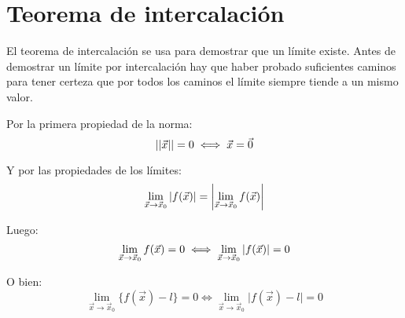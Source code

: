 




\section{Teorema de intercalación}

El teorema de intercalación se usa para demostrar que un límite existe.
Antes de demostrar un límite por intercalación hay que haber probado suficientes caminos para tener certeza que por todos los caminos el límite siempre tiende a un mismo valor.

Por la primera propiedad de la norma:
\begin{equation*}
    {\left|\left| {\Vec{x}} \right|\right|} = 0 \iff \Vec{x} = \Vec{0}
\end{equation*}

Y por las propiedades de los límites:
\begin{equation*}
    \displaystyle\lim_{\Vec{x} \to \Vec{x}_0} {\left| {f(\Vec{x})} \right|}
    = {\left| {\displaystyle\lim_{\Vec{x} \to \Vec{x}_0} f(\Vec{x})} \right|}
\end{equation*}

Luego:
\begin{equation*}
    \lim_{\Vec{x} \to \Vec{x}_0} f(\Vec{x}) = 0 \iff \lim_{\Vec{x} \to \Vec{x}_0} {\left| {f(\Vec{x})} \right|} = 0
\end{equation*}

O bien:
\begin{equation*}
    \lim_{\Vec{x} \to \Vec{x}_0} \Big\{ f(\Vec{x}) - l \Big\} = 0
    \iff
    \lim_{\Vec{x} \to \Vec{x}_0} \Big| f(\Vec{x}) - l \Big| = 0
\end{equation*}

